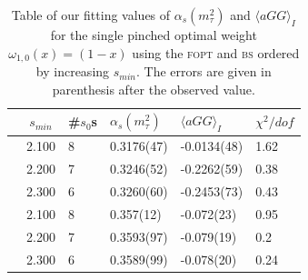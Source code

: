 \documentclass[../../index.tex]{subfiles}
\begin{document}
\begin{table}
  \centering
  \begin{tabularx}{\textwidth}{ccYYYY}
    \toprule
    & \(s_{min}\) & \#\(s_0\)s & \(\alpha_s(m_\tau^2)\) & \(\langle aGG \rangle_I\) & \(\chi^2/dof\)  \\
    \midrule
    \parbox[t]{2mm}{}
    & 2.100 & 8 & 0.3176(47) & -0.0134(48) & 1.62 \\
    & 2.200 & 7 & 0.3246(52) & -0.2262(59) & 0.38 \\
    & 2.300 & 6 & 0.3260(60) & -0.2453(73) & 0.43 \\
    \midrule
    \parbox[t]{2mm}{}
    & 2.100 & 8  & 0.357(12) & -0.072(23) & 0.95 \\
    & 2.200 & 7 &  0.3593(97) & -0.079(19) & 0.2 \\
    & 2.300 & 6 & 0.3589(99) & -0.078(20) & 0.24 \\
    \bottomrule
  \end{tabularx}
  \caption{Table of our fitting values of \(\alpha_s(m_\tau^2)\) and \(\langle
    aGG \rangle_I\) for the single pinched optimal weight
    \(\omega_{1,0}(x)=(1-x)\) using the \textsc{fopt} and \textsc{bs} ordered by
    increasing \(s_{min}\). The errors are given in parenthesis after the
    observed value.}
  \label{table:fitOpt10AlD4}
\end{table}
\end{document}
